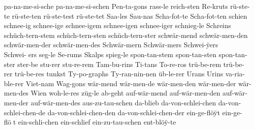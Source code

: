 {  pa-na-me-si-sche %
  pa-na-me-si-schen %
  Pen-ta-gons %
  rass-le %
  reich-sten %
  Re-kruts %
  r^^fc-ste-te %
  r^^fc-ste-ten %
  r^^fc-ste-test %
  r^^fc-ste-tet %
  Saa-les %
  Sau-nas %
  Scha-fot-te %
  Scha-fot-ten %
  schien %
  schnee-ig %
  schnee-ige %
  schnee-igem %
  schnee-igen %
  schnee-iger %
  schnieg-le %
  Schreins %
  sch^^fcch-tern-stem %
  sch^^fcch-tern-sten %
  sch^^fcch-tern-ster %
  schw^^e4r-mend %
  schw^^e4r-men-den %
  schw^^e4r-men-der %
  schw^^e4r-men-des %
  Schw^^e4r-mern %
  Schw^^e4r-mers %
  Schwei-^^ffers %
  Schwei-^^Yers
  seg-le %
  Se-rums %
  Skalps %
  spieg-le %
  spon-tan-stem %
  spon-tan-sten %
  spon-tan-ster %
  ster-be %
  stu-rer %
  stu-re-rem %
  Tam-bu-rins %
  Ti-tans %
  To-re-ros %
  tr^^fc-be-rem %
  tr^^fc-be-rer %
  tr^^fc-be-res %
  tunkst %
  Ty-po-graphs %
  Ty-ran-nin-nen %
  ^^fcb-le-rer %
  Urans %
  Urins %
  va-ria-ble-rer %
  Viet-nam %
  Wag-gons %
  w^^e4r-mend %
  w^^e4r-men-de %
  w^^e4r-men-den %
  w^^e4r-men-der %
  w^^e4r-men-des %
  Wien %
  woh-le-res %
  z^^fcg-le %
%
%
%
  ab-geht %
  auf-w^^e4r-mend %
  auf-w^^e4r-men-den %
  auf-w^^e4r-men-der %
  auf-w^^e4r-men-des %
  aus-zu-tau-schen %
  da-blieb %
  da-von-schlei-chen %
  da-von-schlei-chen-de %
  da-von-schlei-chen-den %
  da-von-schlei-chen-der %
  ein-ge-fl^^f6^^fft %
  ein-ge-fl^^f6^^Yt
  ein-schli-chen %
  ein-schlief %
  ein-zu-tau-schen %
  ent-bl^^f6^^ff-te %
}
